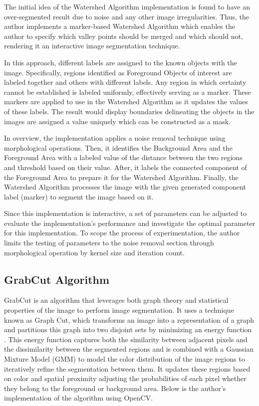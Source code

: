 \documentclass{article}
\begin{document}
The initial idea of the Watershed Algorithm implementation is found to have an over-segmented result due to noise and any other image irregularities. Thus, the author implements a marker-based Watershed Algorithm which enables the author to specify which valley points should be merged and which should not, rendering it an interactive image segmentation technique.

In this approach, different labels are assigned to the known objects with the image. Specifically, regions identified as Foreground Objects of interest are labeled together and others with different labels. Any region in which certainty cannot be established is labeled uniformly, effectively serving as a marker. These markers are applied to use in the Watershed Algorithm as it updates the values of these labels. The result would display boundaries delineating the objects in the images are assigned a value uniquely which can be constructed as a mask.

In overview, the implementation applies a noise removal technique using morphological operations. Then, it identifies the Background Area and the Foreground Area with a labeled value of the distance between the two regions and threshold based on their value. After, it labels the connected component of the Foreground Area to prepare it for the Watershed Algorithm. Finally, the Watershed Algorithm processes the image with the given generated component label (marker) to segment the image based on it.

Since this implementation is interactive, a set of parameters can be adjusted to evaluate the implementation's performance and investigate the optimal parameter for this implementation. To scope the process of experimentation, the author limits the testing of parameters to the noise removal section through morphological operation by kernel size and iteration count. 

\subsection{GrabCut Algorithm}

GrabCut is an algorithm that leverages both graph theory and statistical properties of the image to perform image segmentation. It uses a technique known as Graph Cut, which transforms an image into a representation of a graph and partitions this graph into two disjoint sets by minimizing an energy function \cite{Grabcut2004}. This energy function captures both the similarity between adjacent pixels and the dissimilarity between the segmented regions and is combined with a Gaussian Mixture Model (GMM) to model the color distribution of the image regions to iteratively refine the segmentation between them. It updates these regions based on color and spatial proximity adjusting the probabilities of each pixel whether they belong to the foreground or background area. Below is the author's implementation of the algorithm using OpenCV.
\end{document}
